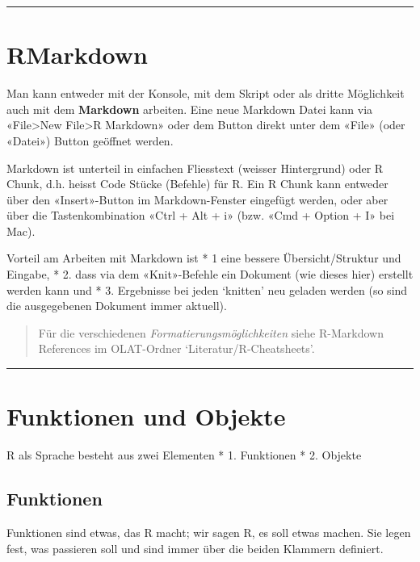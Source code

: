 \documentclass[
]{book}
\begin{document}
\begin{center}\rule{0.5\linewidth}{0.5pt}\end{center}

\hypertarget{rmarkdown}{%
\section{RMarkdown}\label{rmarkdown}}

Man kann entweder mit der Konsole, mit dem Skript oder als dritte Möglichkeit auch mit dem \textbf{Markdown} arbeiten. Eine neue Markdown Datei kann via «File\textgreater New File\textgreater R Markdown» oder dem Button direkt unter dem «File» (oder «Datei») Button geöffnet werden.

Markdown ist unterteil in einfachen Fliesstext (weisser Hintergrund) oder R Chunk, d.h. heisst Code Stücke (Befehle) für R. Ein R Chunk kann entweder über den «Insert»-Button im Markdown-Fenster eingefügt werden, oder aber über die Tastenkombination «Ctrl + Alt + i» (bzw. «Cmd + Option + I» bei Mac).

Vorteil am Arbeiten mit Markdown ist
* 1 eine bessere Übersicht/Struktur und Eingabe,
* 2. dass via dem «Knit»-Befehle ein Dokument (wie dieses hier) erstellt werden kann und
* 3. Ergebnisse bei jeden `knitten' neu geladen werden (so sind die ausgegebenen Dokument immer aktuell).

\begin{quote}
Für die verschiedenen \emph{Formatierungsmöglichkeiten} siehe R-Markdown References im OLAT-Ordner `Literatur/R-Cheatsheets'.
\end{quote}

\begin{center}\rule{0.5\linewidth}{0.5pt}\end{center}

\hypertarget{funktionen-und-objekte}{%
\section{Funktionen und Objekte}\label{funktionen-und-objekte}}

R als Sprache besteht aus zwei Elementen
* 1. Funktionen
* 2. Objekte

\hypertarget{funktionen}{%
\subsection{Funktionen}\label{funktionen}}

Funktionen sind etwas, das R macht; wir sagen R, es soll etwas machen. Sie legen fest, was passieren soll und sind immer über die beiden Klammern definiert.
\end{document}
